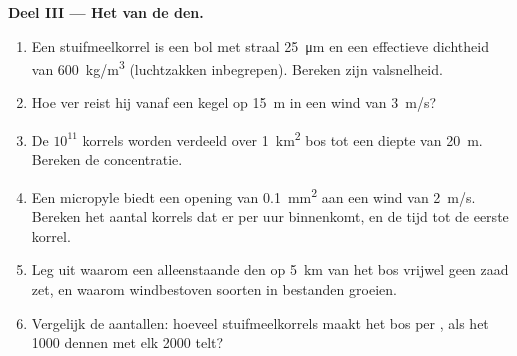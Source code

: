 \begin{problem}
\medskip
\noindent\textbf{Deel III --- Het  van de den.}
\begin{enumerate}[resume]
  \item Een stuifmeelkorrel is een bol met straal \qty{25}{\micro m} en een
        effectieve dichtheid van \qty{600}{kg/m^3} (luchtzakken
        inbegrepen). Bereken zijn valsnelheid.
  \item Hoe ver reist hij vanaf een kegel op \qty{15}{m} in een wind van
        \qty{3}{m/s}?
  \item De $10^{11}$ korrels worden verdeeld over \qty{1}{km^2} bos tot
        een diepte van \qty{20}{m}. Bereken de concentratie.
  \item Een micropyle biedt een opening van \qty{0.1}{mm^2} aan een wind
        van \qty{2}{m/s}. Bereken het aantal korrels dat er per uur
        binnenkomt, en de tijd tot de eerste korrel.
  \item Leg uit waarom een alleenstaande den op \qty{5}{km} van het bos
        vrijwel geen zaad zet, en waarom windbestoven soorten in
        bestanden groeien.
  \item Vergelijk de aantallen: hoeveel stuifmeelkorrels maakt het bos
        per , als het \num{1000} dennen met elk \num{2000}
         telt?
\end{enumerate}


\end{problem}

